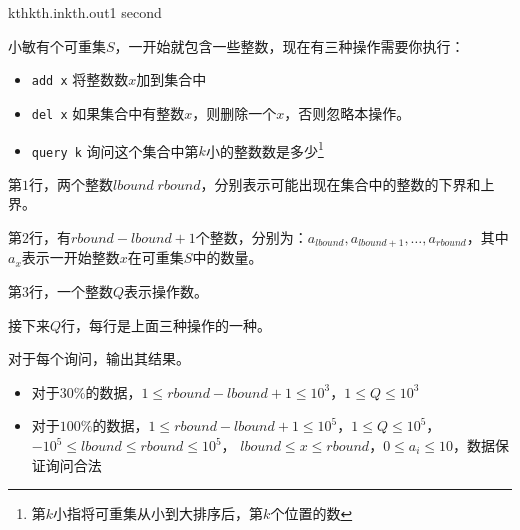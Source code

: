 \documentclass[11pt,a4paper,oneside]{article}
\begin{document}
\begin{problem}{kth}{kth.in}{kth.out}{1 second}
	
	小敏有个可重集$S$，一开始就包含一些整数，现在有三种操作需要你执行：
	
	\begin{itemize}
		\item \texttt{add x} 将整数数$x$加到集合中
		\item \texttt{del x} 如果集合中有整数$x$，则删除一个$x$，否则忽略本操作。
		\item \texttt{query k} 询问这个集合中第$k$小的整数数是多少\footnote{第$k$小指将可重集从小到大排序后，第$k$个位置的数}
	\end{itemize}
	
	\InputFile
	
	第$1$行，两个整数$lbound\;rbound$，分别表示可能出现在集合中的整数的下界和上界。
	
	第$2$行，有$rbound - lbound + 1$个整数，分别为：$a_{lbound},a_{lbound+1},\dots,a_{rbound}$，其中$a_x$表示一开始整数$x$在可重集$S$中的数量。
	
	第$3$行，一个整数$Q$表示操作数。
	
	接下来$Q$行，每行是上面三种操作的一种。
	
	\OutputFile
	
	对于每个询问，输出其结果。
	
	\Example
	
	\begin{example}
\end{example}

\Note
\begin{itemize}
	\item 对于$30\%$的数据，$1 \leq rbound - lbound + 1 \leq 10^3$，$1 \leq Q \leq 10^3$
	\item 对于$100\%$的数据，$1 \leq rbound - lbound + 1 \leq 10^5$，$1 \leq Q \leq 10^5$，$-10^5 \leq lbound \leq rbound \leq 10^5$， $ lbound \leq x \leq rbound$，$ 0 \leq a_i \leq 10$，数据保证询问合法
\end{itemize}
\end{problem}
\end{document}
